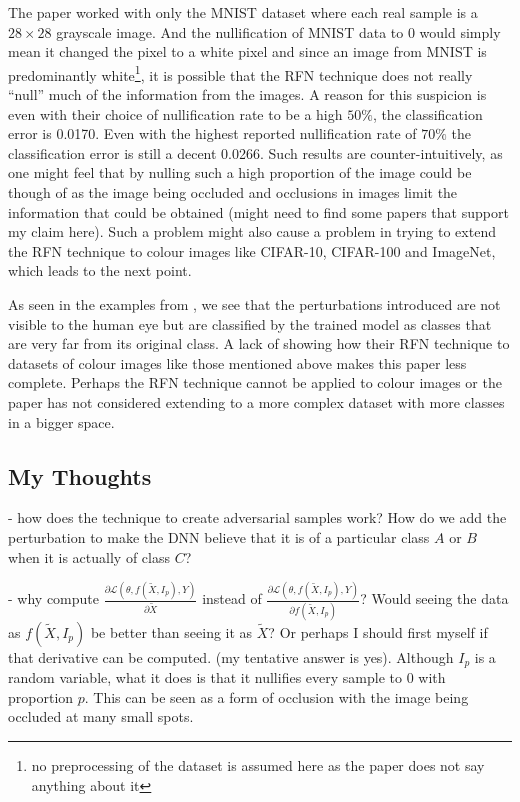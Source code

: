 \documentclass[a4paper,10pt]{article}
\theoremstyle{definition}
\begin{document}
The paper worked with only the MNIST dataset where each real sample is a $28 \times  28$ grayscale image. And the nullification of MNIST data to 0 would simply mean it changed the pixel to a white pixel and since an image from MNIST is predominantly white\footnote{no preprocessing of the dataset is assumed here as the paper does not say anything about it}, it is possible that the RFN technique does not really ``null'' much of the information from the images. A reason for this suspicion is even with their choice of nullification rate to be a high $50\%$, the classification error is 0.0170. Even with the highest reported nullification rate of $70\%$ the classification error is still  a decent 0.0266. Such results are counter-intuitively, as one might feel that by nulling such a high proportion of the image could be though of as the image being occluded and occlusions in images limit the information that could be obtained (might need to find some papers that support my claim here). Such a problem might also cause a problem in trying to extend the RFN technique to colour images like CIFAR-10, CIFAR-100 and ImageNet, which leads to the next point.

As seen in the examples from \cite{szegedy2013intriguing}, we see that the perturbations introduced are not visible to the human eye but are classified by the trained model as classes that are very far from its original class. A lack of showing how their RFN technique to datasets of colour images like those mentioned above makes this paper less complete. Perhaps the RFN technique cannot be applied to colour images or the paper has not considered extending to a more complex dataset with more classes in a bigger space. 


%

\subsection*{My Thoughts}
- how does the technique to create adversarial samples work? How do we add the perturbation to make the DNN believe that it is of a particular class $A$ or $B$ when it is actually of class $C$?


- why compute  $\frac{\partial \mathcal{L}(\theta, f(\tilde{X},I_p),Y)}{\partial \tilde{X}}$ instead of  $\frac{\partial \mathcal{L}(\theta, f(\tilde{X},I_p),Y)}{\partial  f(\tilde{X},I_p)}$? Would seeing the data as $f(\tilde{X},I_p)$  be better than seeing it as $\tilde{X}$? Or perhaps I should first myself if that derivative can be computed. (my tentative answer is yes). Although $I_p$ is a random variable, what it does is that it nullifies every sample to 0 with proportion $p$. This can be seen as a form of occlusion with the image being occluded at many small spots.
\end{document}
